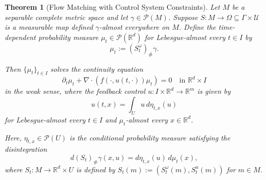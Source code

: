 \documentclass{article}
\newtheorem{theorem}{Theorem}[section]
\begin{document}
\begin{theorem}[Flow Matching with Control System Constraints]
\label{thm:interpogen}
Let $M$ be a separable complete metric space and let $\gamma \in \mathcal{P}(M)$. Suppose $S: M \rightarrow \Omega \subseteq \Gamma \times \mathcal{U}$ is a measurable map defined $\gamma$-almost everywhere on $M$. Define the time-dependent probability measure $\mu_t \in \mathcal{P}(\mathbb{R}^d)$ for Lebesgue-almost every $t \in I$ by 
\[\mu_t := (S^{\omega}_t)_{\#} \gamma.\]

Then $\{\mu_t\}_{t \in I}$ solves the continuity equation 
\begin{equation}
\partial_t \mu_t + \nabla \cdot (f(\cdot, u(t, \cdot))\mu_t) = 0 \quad \text{in } \mathbb{R}^d \times I
\end{equation}
in the weak sense, where the feedback control $u: I \times \mathbb{R}^d \rightarrow \mathbb{R}^m$ is given by
\[u(t,x) = \int_{U} u \, d\eta_{t,x}(u)\]
for Lebesgue-almost every $t \in I$ and $\mu_t$-almost every $x \in \mathbb{R}^d$.

Here, $\eta_{t,x} \in \mathcal{P}(U)$ is the conditional probability measure satisfying the disintegration
\[d(S_t)_{\#} \gamma(x,u) = d\eta_{t,x}(u) \, d\mu_t(x),\]
where $S_t: M \rightarrow \mathbb{R}^d \times U$ is defined by $S_t(m) := (S^{\omega}_t(m), S^u_t(m))$ for $m \in M$.
\end{theorem}
\end{document}
